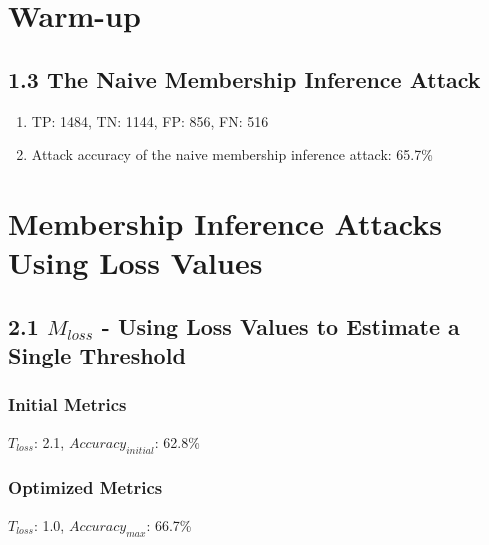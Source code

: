 
\usepackage{hyperref}
\usepackage{booktabs}
\usepackage{comment}
\usepackage{natbib}
\usepackage{bbm}
\usepackage{mathtools}
\usepackage{amsfonts}
\usepackage{appendix}
\usepackage{csquotes}
\usepackage{amssymb}
\usepackage{listings}
\usepackage{float}
\usepackage{caption}
\usepackage{subcaption}
\lstset{
    frame = single,
    breaklines=true,
    basicstyle=\ttfamily}
\usepackage{tikz, forest}
\usepackage{natbib}

\DeclareMathOperator*{\maximize}{maximize}
\DeclareMathOperator*{\minimize}{minimize}





\section{Warm-up}
\subsection*{1.3 The Naive Membership Inference Attack}
\begin{enumerate}
    \item TP: 1484, TN: 1144, FP: 856, FN: 516
    \item Attack accuracy of the naive membership inference attack: 65.7\%
\end{enumerate}


\section{Membership Inference Attacks Using Loss Values}
\subsection*{2.1 $M_{loss}$ - Using Loss Values to Estimate a Single Threshold}

\subsubsection{Initial Metrics}
$T_{loss}$: 2.1, $Accuracy_{initial}$: 62.8\%

\subsubsection{Optimized Metrics}
$T_{loss}$: 1.0, $Accuracy_{max}$: 66.7\% \\

